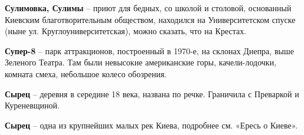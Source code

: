 \medskip

\textbf{Сулимовка, Сулимы} – приют для бедных, со школой и столовой, основанный Киевским благотворительным обществом, находился на Университетском спуске (ныне ул. Круглоуниверситетская), можно сказать, что на Крестах.\\

\medskip

\textbf{Супер-8} – парк аттракционов, построенный в 1970-е, на склонах Днепра, выше Зеленого Театра. Там были невысокие американские горы, качели-лодочки, комната смеха, небольшое колесо обозрения.\\

\medskip

\textbf{Сырец} – деревня в середине 18 века, названа по речке. Граничила с Преваркой и Куреневщиной.\\

\medskip

\textbf{Сырец} – одна из крупнейших малых рек Киева, подробнее см. «Ересь о Киеве».